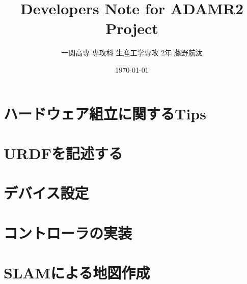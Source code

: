 \documentclass[uplatex, a4paper]{jsreport}
\title{\Huge Developers Note for ADAMR2 Project}
\author{一関高専 専攻科 生産工学専攻 2年 藤野航汰}
\date{\today}
\begin{document}
\maketitle  %

\tableofcontents  %
\newpage

\chapter{ハードウェア組立に関するTips}


\chapter{URDFを記述する}









\chapter{デバイス設定}



\chapter{コントローラの実装}
\label{chap:controller_implementation}











\chapter{SLAMによる地図作成}




\end{document}
